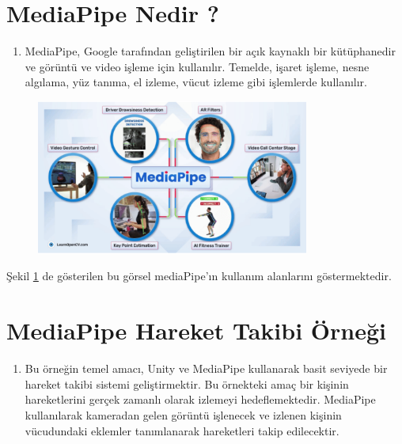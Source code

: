 \documentclass[12pt, a4paper]{article}
\begin{document}
	
	
	
	
	\newpage
	
	
	\title{}
	\author{}
	\date{}
	\maketitle
	\setcounter{section}{0}
	
	\section{MediaPipe Nedir ?}
	\begin{enumerate}
		\item MediaPipe, Google tarafından geliştirilen bir açık kaynaklı bir kütüphanedir ve görüntü ve video işleme için kullanılır. Temelde, işaret işleme, nesne algılama, yüz tanıma, el izleme, vücut izleme gibi işlemlerde kullanılır.
	\end{enumerate}
	\begin{figure}[!ht]
		\caption{}
		\centering
		\includegraphics[width=0.8\textwidth]{mediaPipe.PNG}
		
		\label{mediaPipe}
	\end{figure}
	Şekil \ref{mediaPipe} de gösterilen bu görsel mediaPipe'ın kullanım alanlarını göstermektedir.\cite{MediaPipe}
	\newpage
	\section{MediaPipe Hareket Takibi Örneği}
	\begin{enumerate}
		\item Bu örneğin temel amacı, Unity ve MediaPipe kullanarak basit seviyede bir hareket takibi sistemi geliştirmektir. Bu örnekteki amaç bir kişinin hareketlerini gerçek zamanlı olarak izlemeyi hedeflemektedir. MediaPipe kullanılarak kameradan gelen görüntü işlenecek ve izlenen kişinin vücudundaki eklemler tanımlanarak hareketleri takip edilecektir.
		
	\end{enumerate}
	
\end{document}
